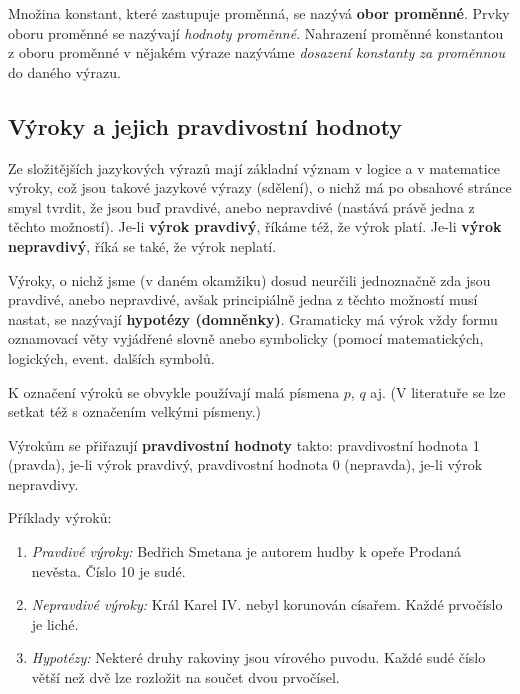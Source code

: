       Množina konstant, které zastupuje proměnná, se nazývá \textbf{obor proměnné}. Prvky oboru 
      proměnné se nazývají \emph{hodnoty proměnné}. Nahrazení proměnné konstantou z oboru 
      proměnné v nějakém výraze nazýváme \emph{dosazení konstanty za proměnnou} do daného výrazu.
    
    \subsection{Výroky a jejich pravdivostní hodnoty}
      Ze složitějších jazykových výrazů mají základní význam v logice a v matematice výroky, což 
      jsou takové jazykové výrazy (sdělení), o nichž má po obsahové stránce smysl tvrdit, že jsou 
      buď pravdivé, anebo nepravdivé (nastává právě jedna z těchto možností). Je-li \textbf{výrok 
      pravdivý}, říkáme též, že výrok platí. Je-li \textbf{výrok nepravdivý}, říká se také, že 
      výrok neplatí.
      
      Výroky, o nichž jsme (v daném okamžiku) dosud neurčili jednoznačně zda jsou pravdivé, anebo 
      nepravdivé, avšak principiálně jedna z těchto možností musí nastat, se nazývají 
      \textbf{hypotézy (domněnky)}. Gramaticky má výrok vždy formu oznamovací věty vyjádřené slovně 
      anebo symbolicky (pomocí matematických, logických, event. dalších symbolů.
      
      K označení výroků se obvykle používají malá písmena \(p\), \(q\) aj. (V literatuře se lze 
      setkat též s označením velkými písmeny.) 
      
      Výrokům se přiřazují \textbf{pravdivostní hodnoty} takto: pravdivostní hodnota \num{1} 
      (pravda), je-li výrok  pravdivý, pravdivostní hodnota \num{0} (nepravda), je-li výrok 
      nepravdivy.
      
      Příklady výroků:
      \begin{enumerate}[label=\alph*), noitemsep]
        \item \emph{Pravdivé výroky:} Bedřich Smetana je autorem hudby k opeře Prodaná 
              nevěsta. Číslo \num{10} je sudé. 
        \item \emph{Nepravdivé výroky:} Král Karel IV. nebyl korunován císařem. Každé prvočíslo 
              je liché. 
        \item \emph{Hypotézy:} Nekteré druhy rakoviny jsou vírového puvodu. Každé sudé číslo větší
              než dvě lze rozložit na součet dvou prvočísel.
      \end{enumerate}

